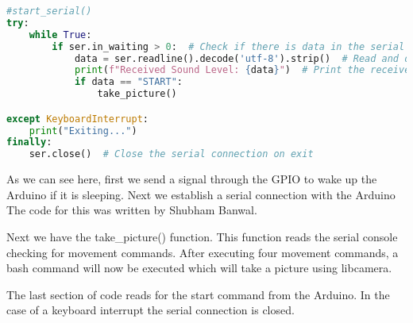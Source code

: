 \documentclass[12pt,a4paper]{article}
\begin{document}
\begin{lstlisting}[language=Python, caption=Rasperry Pi Code]
#start_serial()
try:
    while True:
        if ser.in_waiting > 0:  # Check if there is data in the serial buffer
            data = ser.readline().decode('utf-8').strip()  # Read and decode the data
            print(f"Received Sound Level: {data}")  # Print the received data
            if data == "START":
                take_picture()

except KeyboardInterrupt:
    print("Exiting...")
finally:
    ser.close()  # Close the serial connection on exit

\end{lstlisting}

As we can see here, first we send a signal through the GPIO to wake up the Arduino if it is sleeping.
Next we establish a serial connection with the Arduino
The code for this was written by Shubham Banwal.

Next we have the take_picture() function. This function reads the serial console checking for movement commands.
After executing four movement commands, a bash command will now be executed which will take a picture using libcamera.

The last section of code reads for the start command from the Arduino. In the case of a keyboard interrupt the serial connection is closed.



\end{document}
